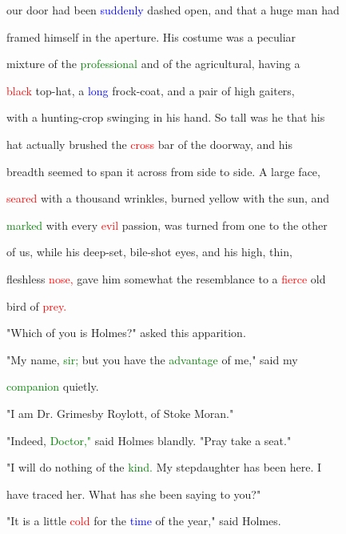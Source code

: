  our door had been \textcolor{blue}{suddenly} dashed open, and that a huge man had

 framed himself in the aperture. His costume was a peculiar

 mixture of the \textcolor{green}{professional} and of the agricultural, having a

 \textcolor{red}{black} top-hat, a \textcolor{blue}{long} frock-coat, and a pair of high gaiters,

 with a hunting-crop swinging in his hand. So tall was he that his

 hat actually brushed the \textcolor{red}{cross} bar of the doorway, and his

 breadth seemed to span it across from side to side. A large face,

 \textcolor{red}{seared} with a thousand wrinkles, burned yellow with the \textcolor{BurntOrange}{sun,} and

 \textcolor{green}{marked} with every \textcolor{red}{evil} \textcolor{BurntOrange}{passion,} was turned from one to the other

 of us, while his deep-set, bile-shot eyes, and his high, thin,

 fleshless \textcolor{red}{nose,} gave him somewhat the resemblance to a \textcolor{red}{fierce} old

 bird of \textcolor{red}{prey.}



 "Which of you is Holmes?" asked this \textcolor{BurntOrange}{apparition.}



 "My name, \textcolor{green}{sir;} but you have the \textcolor{green}{advantage} of me," said my

 \textcolor{green}{companion} quietly.



 "I am Dr. Grimesby Roylott, of Stoke Moran."



 "Indeed, \textcolor{green}{Doctor,"} said Holmes blandly. \textcolor{BurntOrange}{"Pray} take a seat."



 "I will do nothing of the \textcolor{green}{kind.} My stepdaughter has been here. I

 have traced her. What has she been saying to you?"



 "It is a little \textcolor{red}{cold} for the \textcolor{blue}{time} of the year," said Holmes.



